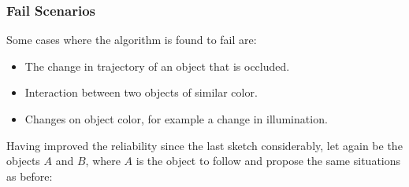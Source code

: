 \subsubsection{Fail Scenarios}

Some cases where the algorithm is found to fail are:
\begin{itemize}
\item The change in trajectory of an object that is occluded.
\item Interaction between two objects of similar color.
\item Changes on object color, for example a change in illumination.
\end{itemize}







Having improved the reliability since the last sketch considerably, let again be the objects $A$ and $B$, where $A$ is the object to follow and propose the same situations as before: 

